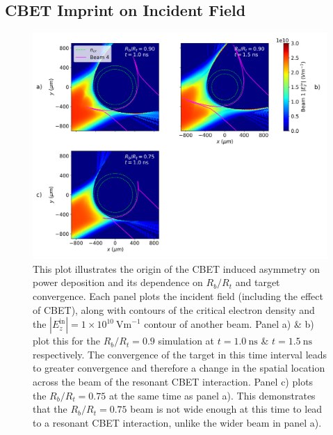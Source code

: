 \subsection{CBET Imprint on Incident Field}%
\label{sec:Res1_CBET_imprint}

\begin{figure}[t!]
    \includegraphics[width=\linewidth]{Results1/Images/Field_profiles.png}
    \centering
    \caption{This plot illustrates the origin of the \ac{CBET} induced asymmetry on power deposition and its dependence on $R_b/R_t$ and target convergence.
    Each panel plots the incident field (including the effect of \ac{CBET}), along with contours of the critical electron density and the $|E_z^{\text{in}}|=1\times10^{10}\ \text{Vm}^{-1}$ contour of another beam.
    Panel a) \& b) plot this for the $R_b/R_t=0.9$ simulation at $t=1.0\ \text{ns}$ \& $t=1.5\ \text{ns}$ respectively.
    The convergence of the target in this time interval leads to greater convergence and therefore a change in the spatial location across the beam of the resonant \ac{CBET} interaction.
    Panel c) plots the $R_b/R_t=0.75$ at the same time as panel a).
    This demonstrates that the $R_b/R_t=0.75$ beam is not wide enough at this time to lead to a resonant \ac{CBET} interaction, unlike the wider beam in panel a).}%
    \label{fig:Res1_field_profiles}
\end{figure}



